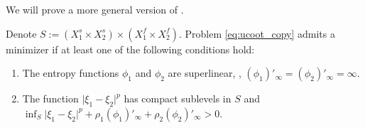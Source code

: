 We will prove a more general version of .
\begin{proposition}
    \label{eq:ucoot_existence_copy}
  Denote $S := (X_1^s \times X_2^s) \times (X_1^f \times X_2^f)$.
  Problem \eqref{eq:ucoot_copy} admits a minimizer if at least one of
  the following conditions hold:
  \begin{enumerate}
    \item The entropy functions $\phi_1$ and $\phi_2$ are superlinear, \ie,
    $(\phi_1)'_{\infty} = (\phi_2)'_{\infty} = \infty$.
    \item The function $\vert \xi_1 - \xi_2 \vert^p$ has compact sublevels in $S$ and
    $\inf_{S} \vert \xi_1 - \xi_2 \vert^p + \rho_1 (\phi_1)'_{\infty} + \rho_2 (\phi_2)'_{\infty} > 0$.
  \end{enumerate}
\end{proposition}
